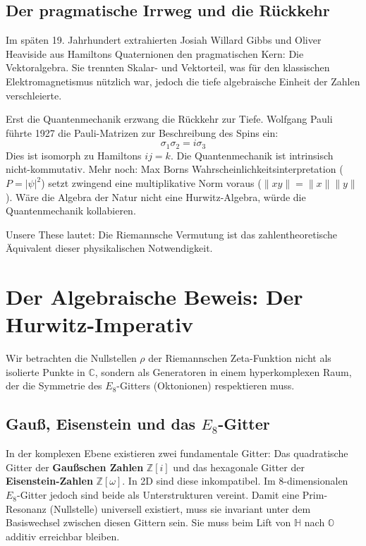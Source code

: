 \documentclass[11pt, a4paper]{article}
\begin{document}
	\subsection{Der pragmatische Irrweg und die Rückkehr}
	Im späten 19. Jahrhundert extrahierten Josiah Willard Gibbs und Oliver Heaviside aus Hamiltons Quaternionen den \glqq pragmatischen Kern\grqq: Die Vektoralgebra. Sie trennten Skalar- und Vektorteil, was für den klassischen Elektromagnetismus nützlich war, jedoch die tiefe algebraische Einheit der Zahlen verschleierte.
	
	Erst die Quantenmechanik erzwang die Rückkehr zur Tiefe. Wolfgang Pauli führte 1927 die Pauli-Matrizen zur Beschreibung des Spins ein:
	\begin{equation}
		\sigma_1 \sigma_2 = i \sigma_3
	\end{equation}
	Dies ist isomorph zu Hamiltons $ij=k$. Die Quantenmechanik ist intrinsisch nicht-kommutativ. Mehr noch: Max Borns Wahrscheinlichkeitsinterpretation ($P = |\psi|^2$) setzt zwingend eine multiplikative Norm voraus ($\|xy\| = \|x\|\|y\|$). Wäre die Algebra der Natur nicht eine Hurwitz-Algebra, würde die Quantenmechanik kollabieren.
	
	Unsere These lautet: Die Riemannsche Vermutung ist das zahlentheoretische Äquivalent dieser physikalischen Notwendigkeit.
	
	\section{Der Algebraische Beweis: Der Hurwitz-Imperativ}
	
	Wir betrachten die Nullstellen $\rho$ der Riemannschen Zeta-Funktion nicht als isolierte Punkte in $\mathbb{C}$, sondern als Generatoren in einem hyperkomplexen Raum, der die Symmetrie des $E_8$-Gitters (Oktonionen) respektieren muss.
	
	\subsection{Gauß, Eisenstein und das $E_8$-Gitter}
	In der komplexen Ebene existieren zwei fundamentale Gitter: Das quadratische Gitter der \textbf{Gaußschen Zahlen} $\mathbb{Z}[i]$ und das hexagonale Gitter der \textbf{Eisenstein-Zahlen} $\mathbb{Z}[\omega]$. In 2D sind diese inkompatibel. Im 8-dimensionalen $E_8$-Gitter jedoch sind beide als Unterstrukturen vereint.
	Damit eine \glqq Prim-Resonanz\grqq{} (Nullstelle) universell existiert, muss sie invariant unter dem Basiswechsel zwischen diesen Gittern sein. Sie muss beim Lift von $\mathbb{H}$ nach $\mathbb{O}$ additiv erreichbar bleiben.
	
\end{document}
